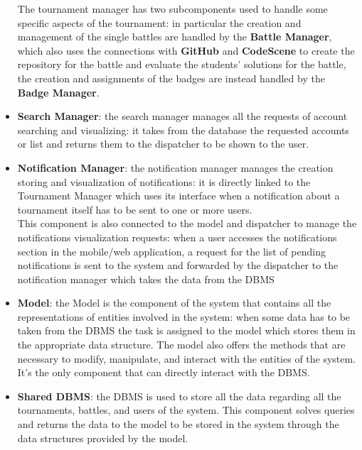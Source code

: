 \documentclass{article}
\begin{document}
\begin{itemize}
    The tournament manager has two subcomponents used to handle some specific aspects of the tournament: in particular the creation and management of the single battles are handled by the \textbf{Battle Manager}, which also uses the connections with \textbf{GitHub} and \textbf{CodeScene} to create the repository for the battle and evaluate the students' solutions for the battle, the creation and assignments of the badges are instead handled by the \textbf{Badge Manager}.
    \item \textbf{Search Manager}: the search manager manages all the requests of account searching and visualizing: it takes from the database the requested accounts or list and returns them to the dispatcher to be shown to the user.
    \item \textbf{Notification Manager}: the notification manager manages the creation storing and visualization of notifications: it is directly linked to the Tournament Manager which uses its interface when a notification about a tournament itself has to be sent to one or more users.\\
    This component is also connected to the model and dispatcher to manage the notifications visualization requests: when a user accesses the notifications section in the mobile/web application, a request for the list of pending notifications is sent to the system and forwarded by the dispatcher to the notification manager which takes the data from the DBMS
    \item \textbf{Model}: the Model is the component of the system that contains all the representations of entities involved in the system: when some data has to be taken from the DBMS the task is assigned to the model which stores them in the appropriate data structure.
    The model also offers the methods that are necessary to modify, manipulate, and interact with the entities of the system.
    It's the only component that can directly interact with the DBMS.
    \item \textbf{Shared DBMS}: the DBMS is used to store all the data regarding all the tournaments, battles, and users of the system.
    This component solves queries and returns the data to the model to be stored in the system through the data structures provided by the model.
\end{itemize}
\newpage
\end{document}
